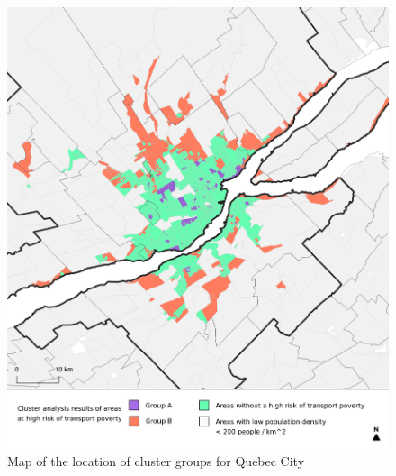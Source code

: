 \documentclass[11 pt, letterpaper]{article}
\begin{document}
{\begin{figure}[H]
	\caption{Map of the location of cluster groups for Quebec City} 
	\label{C_que}
	\centerline{\includegraphics[width=6.5in]{figures/cluster_maps/C_que}}
	\vspace{2mm}
\end{figure}

}
\end{document}
